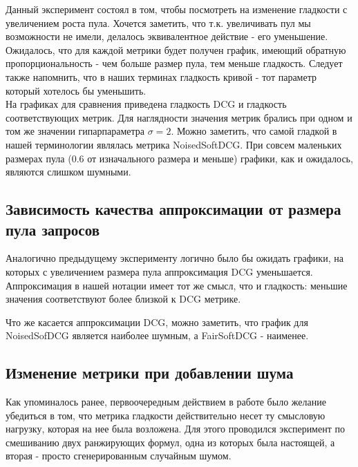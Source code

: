 \documentclass[14pt,a4paper]{amsart}
\theoremstyle{definition}
\theoremstyle{definition}
\begin{document}
Данный эксперимент состоял в том, чтобы посмотреть на изменение гладкости с увеличением роста пула. Хочется заметить, что т.к. увеличивать пул мы возможности не имели, делалось эквивалентное действие - его уменьшение. Ожидалось, что для каждой метрики будет получен график, имеющий обратную пропорциональность - чем больше размер пула, тем меньше гладкость. Следует также напомнить, что в наших терминах гладкость кривой - тот параметр который хотелось бы уменьшить.\\

На графиках для сравнения приведена гладкость DCG и гладкость соответствующих метрик. Для наглядности значения метрик брались при одном и том же значении гипарпараметра $\sigma = 2$. Можно заметить, что самой гладкой в нашей терминологии являлась метрика NoisedSoftDCG. При совсем маленьких размерах пула (0.6 от изначального размера и меньше) графики, как и ожидалось, являются слишком шумными.


\subsection{Зависимость качества аппроксимации от размера пула запросов}

Аналогично предыдущему эксперименту логично было бы ожидать графики, на которых с увеличением размера пула аппроксимация DCG уменьшается. \\

Аппроксимация в нашей нотации имеет тот же смысл, что и гладкость: меньшие значения соответствуют более близкой к DCG метрике.


Что же касается аппроксимации DCG, можно заметить, что график для NoisedSofDCG является наиболее шумным, а FairSoftDCG - наименее. 


\subsection{Изменение метрики при добавлении шума}

Как упоминалось ранее, первоочередным действием в работе было желание убедиться в том, что метрика гладкости действительно несет ту смысловую нагрузку, которая на нее была возложена. Для этого проводился эксперимент по смешиванию двух ранжирующих формул, одна из которых была настоящей, а вторая - просто сгенерированным случайным шумом.
\end{document}
